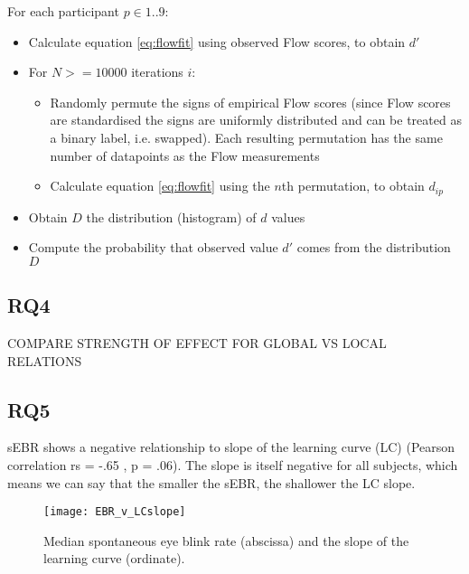 \documentclass[fleqn,10pt]{wlscirep}
\newcommand{\nicewidth}{0.8\textwidth}
\begin{document}
For each participant $p \in 1..9$:
\begin{itemize}
	\item Calculate equation \ref{eq:flowfit} using observed Flow scores, to obtain $d'$
	\item For $N >= 10000$ iterations $i$:
	\begin{itemize}
		\item Randomly permute the signs of empirical Flow scores (since Flow scores are standardised the signs are uniformly distributed and can be treated as a binary label, i.e. swapped). Each resulting permutation has the same number of datapoints as the Flow measurements
		\item Calculate equation \ref{eq:flowfit} using the $n$th permutation, to obtain $d_{ip}$
	\end{itemize}
	\item Obtain $D$ the distribution (histogram) of $d$ values
	\item Compute the probability that observed value $d'$ comes from the distribution $D$
\end{itemize}



\subsection*{RQ4}
{\sf COMPARE STRENGTH OF EFFECT FOR GLOBAL VS LOCAL RELATIONS}


\subsection*{RQ5}
sEBR shows a negative relationship to slope of the learning curve (LC) (Pearson correlation rs = -.65 , p = .06). The slope is itself negative for all subjects, which means we can say that the smaller the sEBR, the shallower the LC slope.

\begin{figure*}[!ht]
	\centering
	\texttt{[image: EBR\_v\_LCslope]}
	\caption{Median spontaneous eye blink rate (abscissa) and the slope of the learning curve (ordinate).}
	\label{fig:EBRvLC}
\end{figure*}
\end{document}
